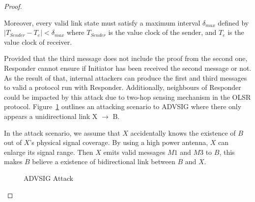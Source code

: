 \begin{flushleft}
\begin{flushleft}
\begin{Definition}
\begin{itemize}
\begin{Definition}
\begin{proof}
\begin{enumerate}
Moreover, every valid link state must satisfy a maximum interval $\delta_{max}$ defined by $|T_{Sender} - T_e | < \delta_{max}$ where $T_{Sender}$ is the value clock of the sender, and $T_e$ is the value clock of receiver. 

Provided that the third message does not include the proof from the second one, Responder cannot ensure if Initiator has been received the second message or not. As the result of that, internal attackers can produce the first and third messages to valid a protocol run with Responder. Additionally,  neighbours of Responder could be impacted by this attack due to two-hop sensing mechanism in the OLSR protocol.  Figure~\ref{advsigattack3} outlines an attacking scenario to ADVSIG where there only appears a unidirectional link X $\rightarrow$ B.

In the attack scenario, we assume that $X$ accidentally knows the existence of $B$ out of $X$'s physical signal coverage. By using a high power antenna, $X$ can enlarge its signal range. Then $X$ emits valid messages $M1$ and $M3$ to $B$, this makes $B$ believe a existence of bidirectional link between $B$ and $X$.   

\begin{figure}
		\caption{ADVSIG Attack }\label{advsigattack3}
        \centering

	    \centering


\end{figure}
\end{enumerate}
\end{proof}
\end{Definition}
\end{itemize}
\end{Definition}
\end{flushleft}
\end{flushleft}

